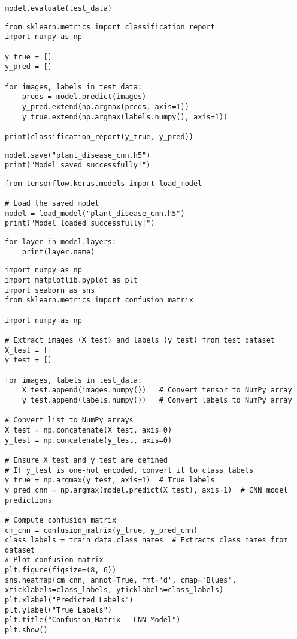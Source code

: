 \documentclass{article}
\begin{document}
\begin{lstlisting}
model.evaluate(test_data)
\end{lstlisting}
\begin{lstlisting}
from sklearn.metrics import classification_report
import numpy as np

y_true = []
y_pred = []

for images, labels in test_data:
    preds = model.predict(images)
    y_pred.extend(np.argmax(preds, axis=1))
    y_true.extend(np.argmax(labels.numpy(), axis=1))

print(classification_report(y_true, y_pred))
\end{lstlisting}
\begin{lstlisting}
model.save("plant_disease_cnn.h5")
print("Model saved successfully!")
\end{lstlisting}
\begin{lstlisting}
from tensorflow.keras.models import load_model

# Load the saved model
model = load_model("plant_disease_cnn.h5")
print("Model loaded successfully!")
\end{lstlisting}
\begin{lstlisting}
for layer in model.layers:
    print(layer.name)
\end{lstlisting}
\begin{lstlisting}
import numpy as np
import matplotlib.pyplot as plt
import seaborn as sns
from sklearn.metrics import confusion_matrix

import numpy as np

# Extract images (X_test) and labels (y_test) from test dataset
X_test = []
y_test = []

for images, labels in test_data:
    X_test.append(images.numpy())   # Convert tensor to NumPy array
    y_test.append(labels.numpy())   # Convert labels to NumPy array

# Convert list to NumPy arrays
X_test = np.concatenate(X_test, axis=0)
y_test = np.concatenate(y_test, axis=0)

# Ensure X_test and y_test are defined
# If y_test is one-hot encoded, convert it to class labels
y_true = np.argmax(y_test, axis=1)  # True labels
y_pred_cnn = np.argmax(model.predict(X_test), axis=1)  # CNN model predictions

# Compute confusion matrix
cm_cnn = confusion_matrix(y_true, y_pred_cnn)
class_labels = train_data.class_names  # Extracts class names from dataset
# Plot confusion matrix
plt.figure(figsize=(8, 6))
sns.heatmap(cm_cnn, annot=True, fmt='d', cmap='Blues', xticklabels=class_labels, yticklabels=class_labels)
plt.xlabel("Predicted Labels")
plt.ylabel("True Labels")
plt.title("Confusion Matrix - CNN Model")
plt.show()
\end{lstlisting}
\end{document}

